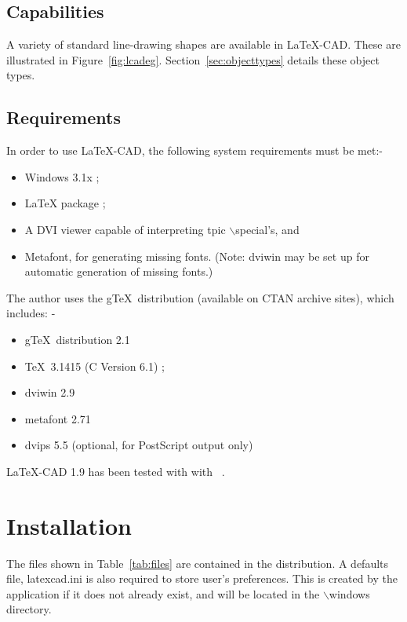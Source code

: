 \documentclass[a4paper]{article}
\newcommand{\bs}{$\backslash$}
\begin{document}
\subsection{ Capabilities }
A variety of standard line-drawing shapes are available in \LaTeX-CAD.
These are illustrated in Figure~\ref{fig:lcadeg}.
Section~\ref{sec:objecttypes} details these object types.



\subsection{ Requirements }
In order to use \LaTeX-CAD, the following system requirements must be met:-
\begin{itemize}
	\item Windows 3.1x ;
	\item \LaTeX\/ package ;
	\item A DVI viewer capable of interpreting tpic \bs special's, and
	\item Metafont, for generating missing fonts. (Note: dviwin may
		be set up for automatic generation of missing fonts.)
\end{itemize}
The author uses the g\TeX\ distribution (available on CTAN archive sites),
which includes: -
\begin{itemize}
	\item g\TeX\ distribution 2.1
	\item \TeX\ 3.1415 (C Version 6.1) ;
	\item dviwin 2.9
	\item metafont 2.71
	\item dvips 5.5 (optional, for PostScript output only)
\end{itemize}

LaTeX-CAD 1.9 has been tested with with \LaTeXe\ .

\section{ Installation }
The files shown in Table~\ref{tab:files} are contained in the
distribution.
A defaults file, latexcad.ini is also required to store
user's preferences. This is created by the application if
it does not already exist, and will be located in
the \bs windows directory.
\end{document}
